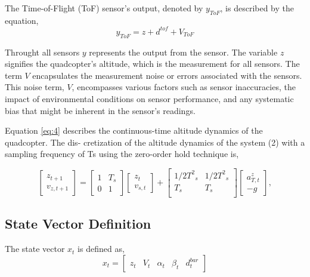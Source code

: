 \documentclass{article}
\begin{document}
\noindent
The Time-of-Flight (ToF) sensor's output, denoted by \( y_{ToF} \), is described by the equation,
\begin{equation}
y_{ToF} = z + d^{tof} + V_{ToF}
\end{equation}

\noindent
Throught all sensors \( y \) represents the output from the sensor. The variable \( z \) signifies the quadcopter's altitude, which is the measurement for all sensors. The term \( V \) encapsulates the measurement noise or errors associated with the sensors. This noise term, \( V \), encompasses various factors such as sensor inaccuracies, the impact of environmental conditions on sensor performance, and any systematic bias that might be inherent in the sensor's readings.

\noindent
Equation \eqref{eq:4} describes the continuous-time altitude dynamics of the quadcopter. The dis-
cretization of the altitude dynamics of the system (2) with a sampling frequency of Ts using the zero-order hold technique is,

\begin{equation}
\begin{bmatrix}
z_{t+1}\\
v_{z,t+1}
\end{bmatrix} =
\begin{bmatrix}
1 & T_s \\
0 & 1 
\end{bmatrix}
\begin{bmatrix}
z_t\\
v_{s,t}
\end{bmatrix} + 
\begin{bmatrix}
{1/2}{T^2}_s & {1/2}{T^2}_s \\
T_s & T_s \\ 
\end{bmatrix}
\begin{bmatrix}
a_{T,t}^z \\ 
-g
\end{bmatrix},
\end{equation}
\subsection{State Vector Definition}
The state vector \( x_t \) is defined as,
\[
    x_t = 
    \begin{bmatrix}
        z_t &
        V_{t} & 
        \alpha_t & 
        \beta_t &
        d^{bar}_t 
    \end{bmatrix}
\]
\end{document}
